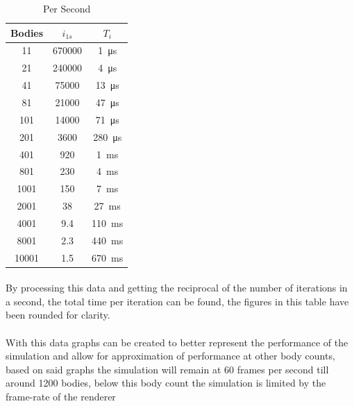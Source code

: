 \pagebreak

\begin{table}
\footnotesize
\centering
\caption{Per Second}
\def\arraystretch{1.5}
\begin{tabular}{|c|c|c|} \hline
Bodies & $i_{1s}$ & $T_i$\\ \hline
    11 & 670000   & \SI{  1}{\micro\second}  \\ \hline
    21 & 240000   & \SI{  4}{\micro\second}  \\ \hline
    41 &  75000   & \SI{ 13}{\micro\second}  \\ \hline
    81 &  21000   & \SI{ 47}{\micro\second}  \\ \hline
   101 &  14000   & \SI{ 71}{\micro\second}  \\ \hline
   201 &   3600   & \SI{280}{\micro\second}  \\ \hline
   401 &    920   & \SI{  1}{\milli\second}  \\ \hline
   801 &    230   & \SI{  4}{\milli\second}  \\ \hline
  1001 &    150   & \SI{  7}{\milli\second}  \\ \hline
  2001 &     38   & \SI{ 27}{\milli\second}  \\ \hline
  4001 &      9.4 & \SI{110}{\milli\second}  \\ \hline
  8001 &      2.3 & \SI{440}{\milli\second}  \\ \hline
 10001 &      1.5 & \SI{670}{\milli\second}  \\ \hline
\end{tabular}
\vspace{-40pt}
\end{table}

\paragraph{}
By processing this data and getting the reciprocal of the number of iterations in a second, the total time per iteration can be found, the figures in this table have been rounded for clarity.

\paragraph{}
With this data graphs can be created to better represent the performance of the simulation and allow for approximation of performance at other body counts, based on said graphs the simulation will remain at 60 frames per second till around 1200 bodies, below this body count the simulation is limited by the frame-rate of the renderer

